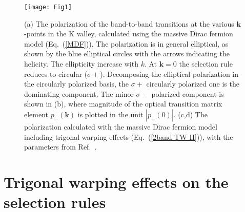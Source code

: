 \documentclass[prb,twocolumn,amsmath,amssymb,superscriptaddress,showpacs]{revtex4}
\begin{document}
\begin{figure}
\texttt{[image: Fig1]}
\caption{(a) The polarization of the band-to-band transitions at the various $\mathbf{k}$-points in the K valley, calculated using the massive Dirac fermion model (Eq.~(\ref{MDF})). The polarization is in general elliptical, as shown by the blue elliptical circles with the arrows indicating the helicity. The ellipticity increase with $k$. At $\mathbf k=0$ the selection rule reduces to circular ($\sigma+$). Decomposing the elliptical polarization in the circularly polarized basis, the $\sigma+$ circularly polarized one is the dominating component. The minor $\sigma-$ polarized component is shown in (b), where magnitude of the optical transition matrix element $p_{-}(\mathbf{k})$ is plotted in the unit $|p_{+}(0)|$.
(c,d) The polarization calculated with the massive Dirac fermion model including trigonal warping effects (Eq.~(\ref{2band TW H})), with the parameters from Ref.~.}
\end{figure}

\section{Trigonal warping effects on the selection rules \label{secionTW}}
\end{document}
